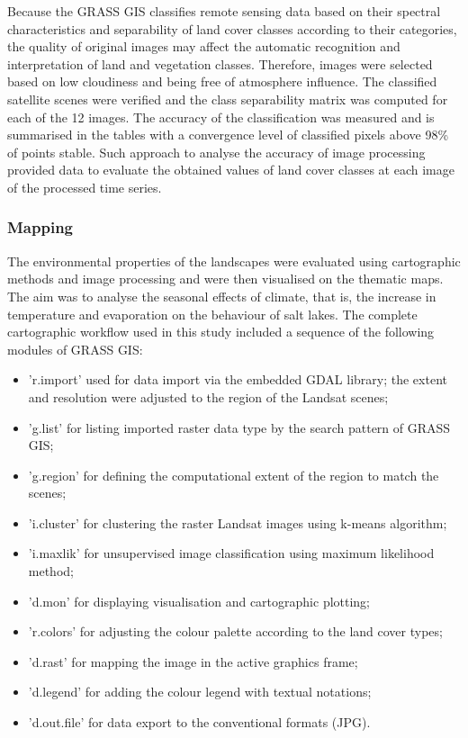 \documentclass[land,article,accept,pdftex,moreauthors]{Definitions/mdpi}
\begin{document}
{Because the GRASS GIS classifies remote sensing data based on their spectral characteristics and separability of land cover classes according to their categories, the quality of original images may affect the automatic recognition and interpretation of land and vegetation classes. Therefore, images were selected based on low cloudiness and being free of atmosphere influence. }The classified satellite scenes were verified and the class separability matrix was computed for each of the 12 images. The accuracy of the classification was measured and is summarised in the tables with a convergence level of classified pixels above 98\% of points stable. Such approach to analyse the accuracy of image processing provided data to evaluate the obtained values of land cover classes at each image of the processed time series.
 
 \subsubsection{Mapping}

The environmental properties of the landscapes were evaluated {using} cartographic methods {and} image processing{ and} were then visualised {on the thematic }maps. The aim was to analyse the seasonal effects of climate{, that is, the }increase in temperature and evaporation{ }on the behaviour of salt lakes. The complete cartographic workflow used in this study included a sequence of the following modules of GRASS GIS:

\begin{itemize}
	\item 'r.import' used for data import via the embedded GDAL library; the extent and resolution were adjusted to the region of the Landsat scenes;
	\item 'g.list' for listing imported raster data type by the search pattern of GRASS GIS; 
	\item 'g.region' for defining the computational extent of the region to match the scenes; 
	\item 'i.cluster' for clustering the raster Landsat images using k-means algorithm; 
	\item 'i.maxlik' for unsupervised image classification using maximum likelihood method; 
	\item 'd.mon' for displaying visualisation and cartographic plotting; 
	\item 'r.colors' for adjusting the colour palette according to the land cover types; 
	\item 'd.rast' for mapping the image in the active graphics frame; 
	\item 'd.legend' for adding the colour legend with textual notations; 
	\item 'd.out.file' for data export to the conventional formats (JPG). 
\end{itemize}
\end{document}
